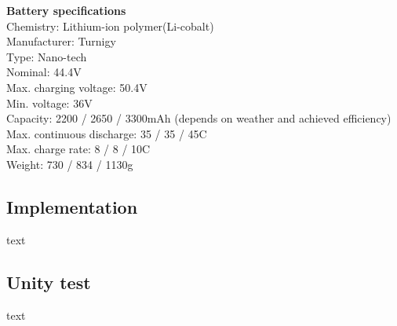 \textbf{Battery specifications}\\
Chemistry: Lithium-ion polymer(Li-cobalt)\\
Manufacturer: Turnigy\\
Type: Nano-tech\\
Nominal: 44.4V\\
Max. charging voltage: 50.4V\\
Min. voltage: 36V\\
Capacity: 2200 / 2650 / 3300mAh (depends on weather and achieved efficiency)\\
Max. continuous discharge: 35 / 35 / 45C\\
Max. charge rate: 8 / 8 / 10C\\
Weight: 730 / 834 / 1130g\\


\subsection{Implementation}
text

\subsection{Unity test}
text